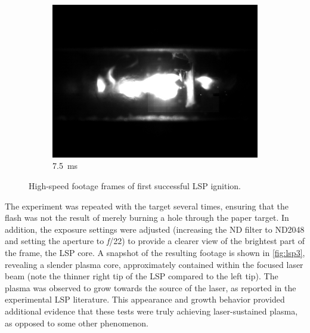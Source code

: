 \begin{figure}[h]
\begin{subfigure}[t]{0.32\textwidth}
                \end{subfigure}
                \hfill
                \begin{subfigure}[t]{0.32\textwidth}
                    \centering
                    \includegraphics[width=\textwidth]{assets/3 design/LSP1_frames/75.jpg}
                    \caption{7.5~ms}
                    \label{fig:lsp1_75}
                \end{subfigure}
                \caption{High-speed footage frames of first successful LSP ignition. }
                \label{fig:lsp1}
            \end{figure}

            The experiment was repeated with the target several times, ensuring that the flash was not the result of merely burning a hole through the paper target. In addition, the exposure settings were adjusted (increasing the ND filter to ND2048 and setting the aperture to \textit{f}/22) to provide a clearer view of the brightest part of the frame, the LSP core. A snapshot of the resulting footage is shown in \autoref{fig:lsp3}, revealing a slender plasma core, approximately contained within the focused laser beam (note the thinner right tip of the LSP compared to the left tip). The plasma was observed to grow towards the source of the laser, as reported in the experimental LSP literature. This appearance and growth behavior provided additional evidence that these tests were truly achieving laser-sustained plasma, as opposed to some other phenomenon.

